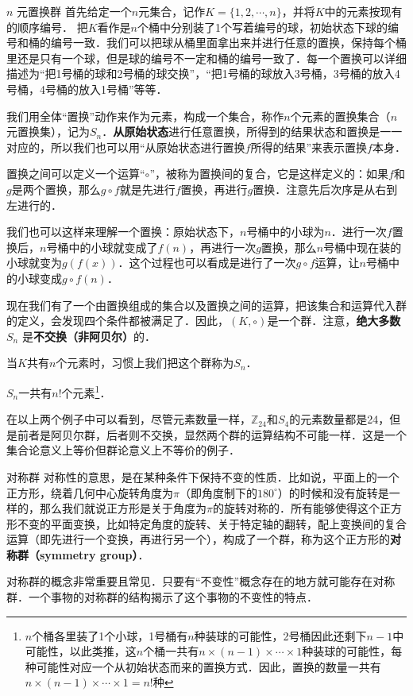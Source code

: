 \begin{example}{$n$ 元置换群}\label{Group_ex3}
首先给定一个$n$元集合，记作$K=\{1,2, \cdots, n\}$，并将$K$中的元素按现有的顺序编号． 把$K$看作是$n$个桶中分别装了1个写着编号的球，初始状态下球的编号和桶的编号一致．我们可以把球从桶里面拿出来并进行任意的置换，保持每个桶里还是只有一个球，但是球的编号不一定和桶的编号一致了．每一个置换可以详细描述为“把1号桶的球和2号桶的球交换”，“把1号桶的球放入3号桶，3号桶的放入4号桶，4号桶的放入1号桶”等等．

我们用全体“置换”动作来作为元素，构成一个集合，称作$n$个元素的置换集合（$n$元置换集），记为$S_n$．\textbf{从原始状态}进行任意置换，所得到的结果状态和置换是一一对应的，所以我们也可以用“从原始状态进行置换$f$所得的结果”来表示置换$f$本身．

置换之间可以定义一个运算“$\circ$”，被称为置换间的复合，它是这样定义的：如果$f$和$g$是两个置换，那么$g\circ f$就是先进行$f$置换，再进行$g$置换．注意先后次序是从右到左进行的．

我们也可以这样来理解一个置换：原始状态下，$n$号桶中的小球为$n$．进行一次$f$置换后，$n$号桶中的小球就变成了$f(n)$，再进行一次$g$置换，那么$n$号桶中现在装的小球就变为$g(f(x))$．这个过程也可以看成是进行了一次$g\circ f$运算，让$n$号桶中的小球变成$g\circ f(n)$．

现在我们有了一个由置换组成的集合以及置换之间的运算，把该集合和运算代入群的定义，会发现四个条件都被满足了．因此，$(K, \circ)$是一个群．注意，\textbf{绝大多数} $S_n$ 是\textbf{不交换（非阿贝尔）}的．

当$K$共有$n$个元素时，习惯上我们把这个群称为$S_n$．

$S_n$一共有$n!$个元素\footnote{$n$个桶各里装了1个小球，1号桶有$n$种装球的可能性，2号桶因此还剩下$n-1$中可能性，以此类推，这$n$个桶一共有$n\times(n-1)\times\cdots\times1$种装球的可能性，每种可能性对应一个从初始状态而来的置换方式．因此，置换的数量一共有$n\times(n-1)\times\cdots\times1=n!$种}．
\end{example}

在以上两个例子中可以看到，尽管元素数量一样，$\mathbb{Z}_{24}$和$S_4$的元素数量都是24，但是前者是阿贝尔群，后者则不交换，显然两个群的运算结构不可能一样．这是一个集合论意义上等价但群论意义上不等价的例子．

\begin{example}{对称群}\label{Group_ex4}
对称性的意思，是在某种条件下保持不变的性质．比如说，平面上的一个正方形，绕着几何中心旋转角度为$\pi$（即角度制下的$180^\circ$）的时候和没有旋转是一样的，那么我们就说正方形是关于角度为$\pi$的旋转对称的．所有能够使得这个正方形不变的平面变换，比如特定角度的旋转、关于特定轴的翻转，配上变换间的复合运算（即先进行一个变换，再进行另一个），构成了一个群，称为这个正方形的\textbf{对称群（symmetry group）}．
\end{example}
对称群的概念非常重要且常见．只要有“不变性”概念存在的地方就可能存在对称群．一个事物的对称群的结构揭示了这个事物的不变性的特点．

